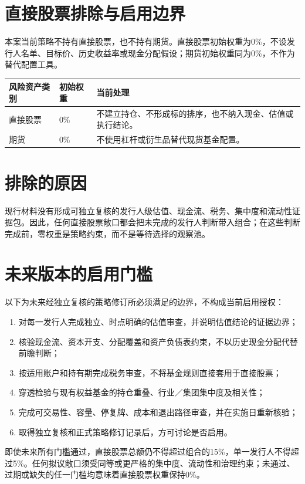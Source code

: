 \section{直接股票排除与启用边界}

本案当前策略不持有直接股票，也不持有期货。直接股票初始权重为0\%，不设发行人名单、目标价、历史收益率或现金分配假设；期货初始权重同为0\%，不作为替代配置工具。

\begin{exhibitbox}
\small
\begin{tabularx}{\exhibitboxwidth}{L{3.0cm}P P}
\toprule
\textbf{风险资产类别} & \textbf{初始权重} & \textbf{当前处理} \\
\midrule
直接股票 & 0\% & 不建立持仓、不形成标的排序，也不纳入现金、估值或执行结论。 \\
期货 & 0\% & 不使用杠杆或衍生品替代现货基金配置。 \\
\bottomrule
\end{tabularx}
\end{exhibitbox}

\section{排除的原因}

现行材料没有形成可独立复核的发行人级估值、现金流、税务、集中度和流动性证据包。因此，任何直接股票敞口都会把未完成的发行人判断带入组合；在这些判断完成前，零权重是策略约束，而不是等待选择的观察池。

\section{未来版本的启用门槛}

以下为未来经独立复核的策略修订所必须满足的边界，不构成当前启用授权：

\begin{enumerate}
  \item 对每一发行人完成独立、时点明确的估值审查，并说明估值结论的证据边界；
  \item 核验现金流、资本开支、分配覆盖和资产负债表约束，不以历史现金分配代替前瞻判断；
  \item 按适用账户和持有期完成税务审查，不将基金规则直接套用于直接股票；
  \item 穿透检验与现有权益基金的持仓重叠、行业／集团集中度及相关性；
  \item 完成可交易性、容量、停复牌、成本和退出路径审查，并在实施日重新核验；
  \item 取得独立复核和正式策略修订记录后，方可讨论是否启用。
\end{enumerate}

即使未来所有门槛通过，直接股票总额仍不得超过组合的15\%，单一发行人不得超过5\%。任何拟议敞口须受同等或更严格的集中度、流动性和治理约束；未通过、过期或缺失的任一门槛均意味着直接股票权重保持0\%。

